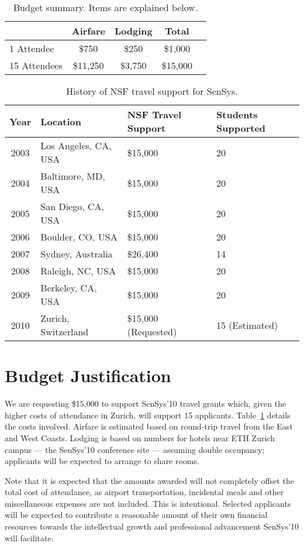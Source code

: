 \documentclass[11pt,letterpaper]{article}
\begin{document}
\begin{table}[t]
\begin{center}
\begin{tabular}{|l|ccc|c|}
\hline
& \textbf{Airfare} & \textbf{Lodging} & \textbf{Total} \\
\hline \hline
1 Attendee & \$750 & \$250 & \$1,000 \\
15 Attendees & \$11,250 & \$3,750 & \$15,000 \\
\hline
\end{tabular}
\end{center}
\caption{Budget summary. Items are explained below.}
\label{table-budget}
\end{table}

\begin{table}[t]
\begin{center}
\begin{tabular}{|c|lll|}
\hline
\textbf{Year} & \textbf{Location} & \textbf{NSF Travel Support} & \textbf{Students Supported} \\
\hline \hline
2003 & Los Angeles, CA, USA & \$15,000 & 20 \\
2004 & Baltimore, MD, USA & \$15,000 & 20 \\
2005 & San Diego, CA, USA & \$15,000 & 20 \\
2006 & Boulder, CO, USA & \$15,000 & 20 \\
2007 & Sydney, Australia & \$26,400 & 14 \\
2008 & Raleigh, NC, USA & \$15,000 & 20 \\
2009 & Berkeley, CA, USA & \$15,000 & 20 \\
2010 & Zurich, Switzerland & \$15,000 (Requested) & 15 (Estimated) \\
\hline
\end{tabular}
\end{center}
\caption{History of NSF travel support for SenSys.}
\label{table-history}
\end{table}

\section*{Budget Justification}
\label{sec-budget}

We are requesting \$15,000 to support SenSys'10 travel grants which, given
the higher costs of attendance in Zurich, will support 15 applicants.
Table~\ref{table-budget} details the costs involved. Airfare is estimated
based on round-trip travel from the East and West Coasts. Lodging is based on
numbers for hotels near ETH Zurich campus --- the SenSys'10 conference site
--- assuming double occupancy; applicants will be expected to arrange to
share rooms.

Note that it is expected that the amounts awarded will not completely offset
the total cost of attendance, as airport transportation, incidental meals and
other miscellaneous expenses are not included. This is intentional. Selected
applicants will be expected to contribute a reasonable amount of their own
financial resources towards the intellectual growth and professional
advancement SenSys'10 will facilitate.
\end{document}
